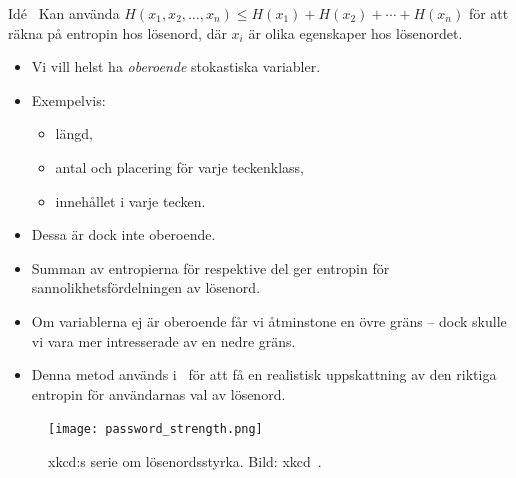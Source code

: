 \documentclass{beamer}
\begin{document}
\begin{frame}
  \begin{block}{Idé~\cite{Komanduri2011opa}}
    Kan använda \(H(x_1, x_2, \ldots, x_n) \leq H(x_1) + H(x_2) + \cdots 
      + H(x_n)\) för att räkna på entropin hos lösenord, där \(x_i\) är olika 
    egenskaper hos lösenordet.
  \end{block}

  \begin{example}
    \begin{itemize}
      \item Vi vill helst ha \emph{oberoende} stokastiska variabler.

      \item Exempelvis:
        \begin{itemize}
          \item längd,
          \item antal och placering för varje teckenklass,
          \item innehållet i varje tecken.
        \end{itemize}

      \item Dessa är dock inte oberoende.

      \item Summan av entropierna för respektive del ger entropin för 
        sannolikhetsfördelningen av lösenord.

    \end{itemize}
  \end{example}
\end{frame}

\begin{frame}
  \begin{remark}
    \begin{itemize}
      \item Om variablerna ej är oberoende får vi åtminstone en övre gräns -- 
        dock skulle vi vara mer intresserade av en nedre gräns.

      \item Denna metod används i~\cite{Komanduri2011opa} för att få en 
        realistisk uppskattning av den riktiga entropin för användarnas val av 
        lösenord.

    \end{itemize}
  \end{remark}
\end{frame}

\begin{frame}
  \begin{figure}
    \texttt{[image: password\_strength.png]}
    \caption{xkcd:s serie om lösenordsstyrka.
    Bild: xkcd~\cite{xkcd936}.}
  \end{figure}
\end{frame}
\end{document}
